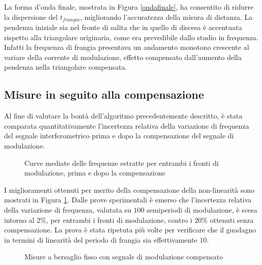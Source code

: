 La forma d'onda finale, mostrata in Figura \ref{ondafinale}, ha consentito di ridurre la dispersione del $t_{frangia}$, migliorando l'accuratezza della misura di distanza. La pendenza iniziale sia nel fronte di salita che in quello di discesa è accentuata rispetto alla triangolare originaria, come era prevedibile dallo studio in frequenza. Infatti la frequenza di frangia presentava un andamento monotono crescente al variare della corrente di modulazione, effetto compensato dall'aumento della pendenza nella triangolare compensata.

\subsection{Misure in seguito alla compensazione}
Al fine di valutare la bontà dell'algoritmo precedentemente descritto, è stata comparata quantitativamente l'incertezza relativa della variazione di frequenza del segnale interferometrico prima e dopo la compensazione del segnale di modulazione.

\begin{figure}
\centering
{}
\hspace{5mm}
\caption{Curve mediate delle frequenze estratte per entrambi i fronti di modulazione, prima e dopo la compensazione}\label{primadopocomp}
\end{figure}

I miglioramenti ottenuti per merito della compensazione della non-linearità sono mostrati in Figura \ref{primadopocomp}. Dalle prove sperimentali è emerso che l'incertezza relativa della variazione di frequenza, valutata su $100$ semiperiodi di modulazione, è scesa intorno al $2\%$, per entrambi i fronti di modulazione, contro i $20\%$ ottenuti senza compensazione. La prova è stata ripetuta più volte per verificare che il guadagno in termini di linearità del periodo di frangia sia effettivamente $10$.
\begin{figure}
\centering
{}
\hspace{5mm}
\caption{Misure a bersaglio fisso con segnale di modulazione compensato}\label{misfisso3}
\end{figure}

